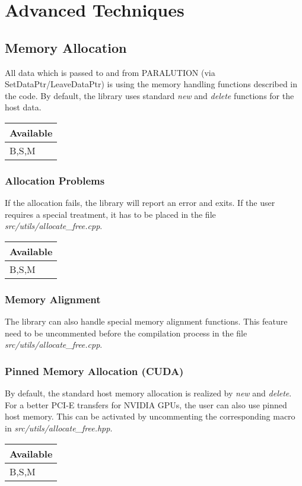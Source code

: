 \chapter{Advanced Techniques}

\section{Memory Allocation}

All data which is passed to and from PARALUTION (via SetDataPtr/LeaveDataPtr) is using the memory handling functions described in the code. By default, the library uses standard \emph{new} and \emph{delete} functions for the host data.

\begin{table}[H]
\begin{tabular}{l}
Available \\ \hline
B,S,M    
\end{tabular}
\end{table}

\subsection{Allocation Problems}

If the allocation fails, the library will report an error and exits. If the user requires a special treatment, it has to be placed in the file \emph{src/utils/allocate\_free.cpp}.

\begin{table}[H]
\begin{tabular}{l}
Available \\ \hline
B,S,M    
\end{tabular}
\end{table}

\subsection{Memory Alignment}

The library can also handle special memory alignment functions. This feature need to be uncommented before the compilation process in the file \emph{src/utils/allocate\_free.cpp}.


\subsection{Pinned Memory Allocation (CUDA)}

By default, the standard host memory allocation is realized by \emph{new} and \emph{delete}. For a better PCI-E transfers for NVIDIA GPUs, the user can also use pinned host memory. This can be activated by uncommenting the corresponding macro in \emph{src/utils/allocate\_free.hpp}.
\begin{table}[H]
\begin{tabular}{l}
Available \\ \hline
B,S,M    
\end{tabular}
\end{table}
